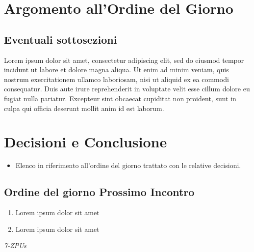 \documentclass[a4paper,12pt]{article}
\begin{document}
\vspace{0.5cm}


\section{Argomento all'Ordine del Giorno}

\subsection{Eventuali sottosezioni}
Lorem ipsum dolor sit amet, consectetur adipiscing elit, sed do eiusmod tempor incidunt ut labore et dolore magna aliqua. Ut enim ad minim veniam, quis nostrum exercitationem ullamco laboriosam, nisi ut aliquid ex ea commodi consequatur. Duis aute irure reprehenderit in voluptate velit esse cillum dolore eu fugiat nulla pariatur. Excepteur sint obcaecat cupiditat non proident, sunt in culpa qui officia deserunt mollit anim id est laborum.

\vspace{0.5cm}
\section{Decisioni e Conclusione}
\begin{itemize}
    \item Elenco in riferimento all'ordine del giorno trattato con le relative decisioni.
\end{itemize}

\subsection{Ordine del giorno Prossimo Incontro}
\begin{enumerate}
    \item Lorem ipsum dolor sit amet
    \item Lorem ipsum dolor sit amet
\end{enumerate}

\vfill
\begin{flushright}
    \textit{7-ZPUs}
\end{flushright}
\end{document}
